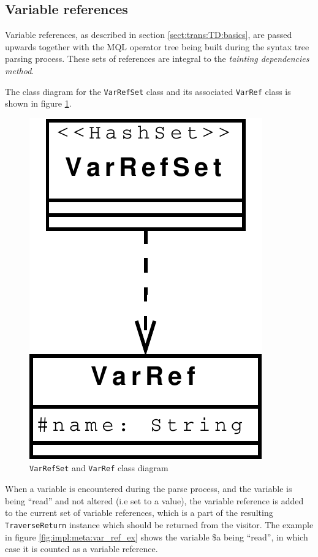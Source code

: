 \subsection{Variable references}
Variable references, as described in section \ref{sect:trans:TD:basics}, are
passed upwards together with the MQL operator tree being built during the syntax
tree parsing process. These sets of references are integral to the
\textit{tainting dependencies method}.

The class diagram for the \texttt{VarRefSet} class and its associated
\texttt{VarRef} class is shown in figure \ref{fig:impl:meta:varrefset_uml}.

\begin{figure}[!htp]
\begin{center}
  \includegraphics[scale=0.5]{diagrams/varrefset_uml}
  \caption{\texttt{VarRefSet} and \texttt{VarRef} class diagram}
  \label{fig:impl:meta:varrefset_uml}
\end{center}
\end{figure}

When a variable is encountered during the parse process, and the variable is
being ``read'' and not altered (i.e set to a value), the variable reference is
added to the current set of variable references, which is a part of the resulting
\texttt{TraverseReturn} instance which should be returned from the visitor.
The example in figure \ref{fig:impl:meta:var_ref_ex} shows the variable \$a
being ``read'', in which case it is counted as a variable reference.


